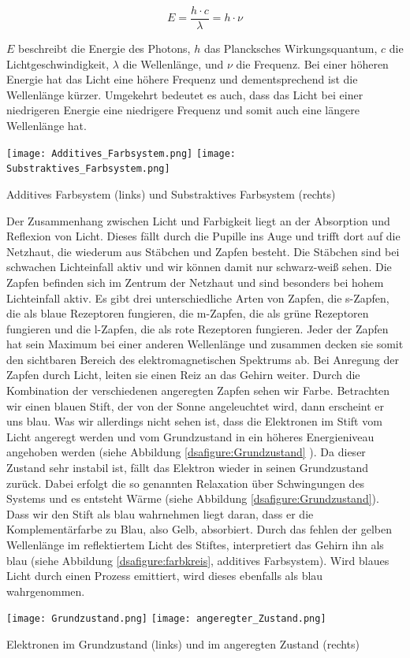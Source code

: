 \begin{equation}
E = \frac{h \cdot c}{\lambda} 
= h \cdot \nu
\end{equation}

$E$ beschreibt die Energie des Photons, $h$ das Plancksches Wirkungsquantum, $c$ die Lichtgeschwindigkeit, $\lambda$ die Wellenlänge, und $\nu$ die Frequenz.
Bei einer höheren Energie hat das Licht eine höhere Frequenz und dementsprechend ist die Wellenlänge kürzer. Umgekehrt bedeutet es auch, dass das Licht bei einer niedrigeren Energie eine niedrigere Frequenz und somit auch eine längere Wellenlänge hat.

\begin{dsafigure}
 \centering
 \texttt{[image: Additives\_Farbsystem.png]}
  \hfill
 \texttt{[image: Substraktives\_Farbsystem.png]}
 \caption{Additives Farbsystem (links)\cite{Additives_Farbsystem} und Substraktives Farbsystem (rechts)\cite{Subtraktives_Farbsystem}}
 \label{dsafigure:farbkreis}
\end{dsafigure}


Der Zusammenhang zwischen Licht und Farbigkeit liegt an der Absorption und Reflexion von Licht. Dieses fällt durch die Pupille ins Auge und trifft dort auf die Netzhaut, die wiederum aus Stäbchen und Zapfen besteht. Die Stäbchen sind bei schwachen Lichteinfall aktiv und wir können damit nur schwarz-weiß sehen. Die Zapfen befinden sich im Zentrum der Netzhaut und sind besonders bei hohem Lichteinfall aktiv. Es gibt drei unterschiedliche Arten von Zapfen, die s-Zapfen, die als blaue Rezeptoren fungieren, die m-Zapfen, die als grüne Rezeptoren fungieren und die l-Zapfen, die als rote Rezeptoren fungieren. Jeder der Zapfen hat sein Maximum bei einer anderen Wellenlänge und zusammen decken sie somit den sichtbaren Bereich des elektromagnetischen Spektrums ab. 
Bei Anregung der Zapfen durch Licht, leiten sie einen Reiz an das Gehirn weiter. Durch die Kombination der verschiedenen angeregten Zapfen sehen wir Farbe.
Betrachten wir einen blauen Stift, der von der Sonne angeleuchtet wird, dann erscheint er uns blau. Was wir allerdings nicht sehen ist, dass die Elektronen im Stift vom Licht angeregt werden und vom Grundzustand in ein höheres Energieniveau angehoben werden (siehe Abbildung \ref{dsafigure:Grundzustand} ). Da dieser Zustand sehr instabil ist, fällt das Elektron wieder in seinen Grundzustand zurück. Dabei erfolgt die so genannten Relaxation über Schwingungen des Systems und es entsteht Wärme (siehe Abbildung \ref{dsafigure:Grundzustand}). Dass wir den Stift als blau wahrnehmen liegt daran, dass er die Komplementärfarbe zu Blau, also Gelb, absorbiert. Durch das fehlen der gelben Wellenlänge im reflektiertem Licht des Stiftes, interpretiert das Gehirn ihn als blau (siehe Abbildung \ref{dsafigure:farbkreis}, additives Farbsystem).
Wird blaues Licht durch einen Prozess emittiert, wird dieses ebenfalls als blau wahrgenommen.


\begin{dsafigure}
 \centering
 \texttt{[image: Grundzustand.png]}
   \hfill
   \texttt{[image: angeregter\_Zustand.png]}
 \caption{Elektronen im Grundzustand (links) und im angeregten Zustand (rechts)}
 \label{dsafigure:Grundzustand}
\end{dsafigure}

